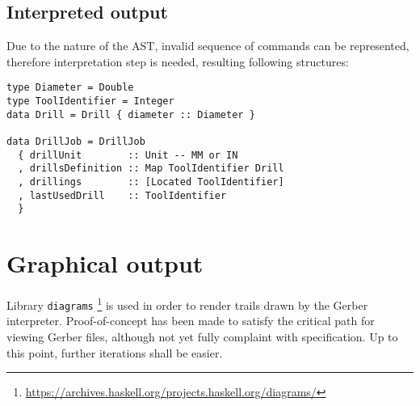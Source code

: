 \documentclass[12pt,a4paper]{article}
\begin{document}
\subsection{Interpreted output}
Due to the nature of the AST, invalid sequence of commands can be represented, therefore interpretation step is needed, resulting following structures:

\lstset{language=haskell}
\lstset{frame=lines}
\lstset{basicstyle=\footnotesize\ttfamily}
\begin{lstlisting}
type Diameter = Double
type ToolIdentifier = Integer
data Drill = Drill { diameter :: Diameter }

data DrillJob = DrillJob
  { drillUnit        :: Unit -- MM or IN
  , drillsDefinition :: Map ToolIdentifier Drill
  , drillings        :: [Located ToolIdentifier]
  , lastUsedDrill    :: ToolIdentifier
  }
\end{lstlisting}

\section{Graphical output}
Library \texttt{diagrams} \footnote{\url{https://archives.haskell.org/projects.haskell.org/diagrams/}} is used in order to render trails drawn by the Gerber interpreter. Proof-of-concept has been made to satisfy the critical path for viewing Gerber files, although not yet fully complaint with specification. Up to this point, further iterations shall be easier.

\end{document}
